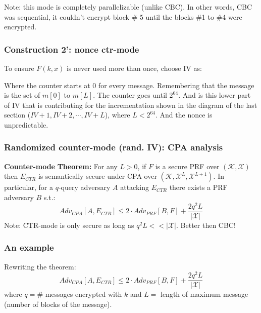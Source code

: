 \documentclass[12pt]{book}
\newcommand{\Thm}{\textbf{Theorem:} }
\begin{document}
Note: this mode is completely parallelizable (unlike CBC). In other words, CBC was sequential, it couldn't encrypt block \# 5 until the blocks \#1 to \#4 were encrypted.

\subsubsection{Construction 2': nonce ctr-mode}
To ensure $F(k,x)$ is never used more than once, choose IV as:
\begin{center}
\end{center}Where the counter starts at 0 for every message. Remembering that the message is the set of $m[0]$ to $m[L]$. The counter goes until $2^{64}$. And is this lower part of IV that is contributing for the incrementation shown in the diagram of the last section ($IV+1,IV+2,\cdots,IV+L$), where $L<2^{64}$. And the nonce is unpredictable.

\subsubsection{Randomized counter-mode (rand. IV): CPA analysis}
\textbf{Counter-mode }\Thm For any $L>0$, if $F$ is a secure PRF over $(\mathcal{K,X})$ then $E_{CTR}$ is semantically secure under CPA over $(\mathcal{K},\mathcal{X}^{L},\mathcal{X}^{L+1})$. In particular, for a $q$-query adversary $A$ attacking $E_{CTR}$ there exists a PRF adversary $B$ s.t.:
$$Adv_{CPA}[A,E_{CTR}]\leq 2\cdot Adv_{PRF}[B,F]+\frac{2q^{2}L}{|\mathcal{X}|}$$
Note: CTR-mode is only secure as long as $q^{2}L<<|\mathcal{X|}$. Better then CBC!

\subsubsection{An example}
Rewriting the theorem:
$$Adv_{CPA}[A,E_{CTR}]\leq 2\cdot Adv_{PRF}[B,F]+\frac{2q^{2}L}{|\mathcal{X}|}$$
where $q=\#$ messages encrypted with $k$ and $L=$ length of maximum message (number of blocks of the message).
\end{document}
